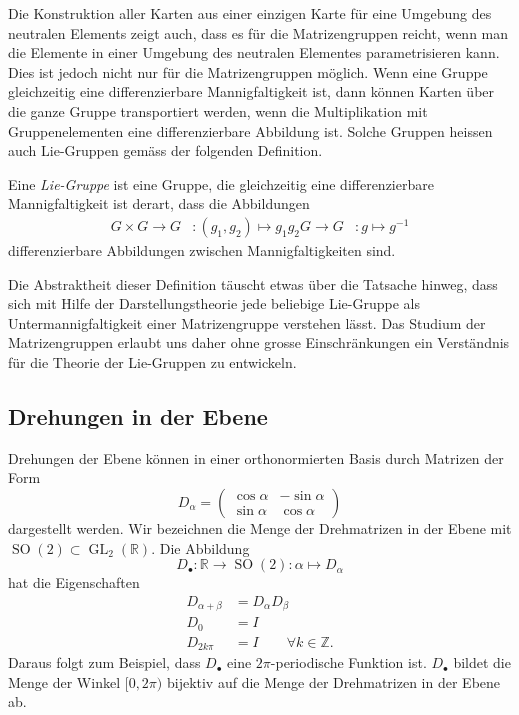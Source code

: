 Die Konstruktion aller Karten aus einer einzigen Karte für eine
Umgebung des neutralen Elements zeigt auch, dass es für die Matrizengruppen
reicht, wenn man die Elemente in einer Umgebung des neutralen
Elementes parametrisieren kann.
Dies ist jedoch nicht nur für die Matrizengruppen möglich.
Wenn eine Gruppe gleichzeitig eine differenzierbare Mannigfaltigkeit
ist, dann können Karten über die ganze Gruppe transportiert werden,
wenn die Multiplikation mit Gruppenelementen eine differenzierbare
Abbildung ist.
Solche Gruppen heissen auch Lie-Gruppen gemäss der folgenden Definition.

\begin{definition}
%
Eine {\em Lie-Gruppe} ist eine Gruppe, die gleichzeitig eine differenzierbare
Mannigfaltigkeit ist derart, dass die Abbildungen
\begin{align*}
G\times G \to G &: (g_1,g_2)\mapsto g_1g_2
G\to G &: g \mapsto g^{-1}
\end{align*}
differenzierbare Abbildungen zwischen Mannigfaltigkeiten sind.
\end{definition}

Die Abstraktheit dieser Definition täuscht etwas über die 
Tatsache hinweg, dass sich mit Hilfe der Darstellungstheorie
jede beliebige Lie-Gruppe als Untermannigfaltigkeit einer 
Matrizengruppe verstehen lässt.
Das Studium der Matrizengruppen erlaubt uns daher ohne grosse
Einschränkungen ein Verständnis für die Theorie der Lie-Gruppen
zu entwickeln.

\subsection{Drehungen in der Ebene
\label{buch:gruppen:drehungen2d}}
Drehungen der Ebene können in einer orthonormierten Basis durch
Matrizen der Form
\[
D_{\alpha}
=
\begin{pmatrix}
\cos\alpha&-\sin\alpha\\
\sin\alpha& \cos\alpha
\end{pmatrix}
\]
dargestellt werden.
Wir bezeichnen die Menge der Drehmatrizen in der Ebene mit
$\operatorname{SO}(2)\subset\operatorname{GL}_2(\mathbb{R})$.
Die Abbildung
\[
D_{\bullet}
\colon
\mathbb{R}\to \operatorname{SO}(2)
:
\alpha \mapsto D_{\alpha}
\]
hat die Eigenschaften
\begin{align*}
D_{\alpha+\beta}&= D_{\alpha}D_{\beta}
\\
D_0&=I
\\
D_{2k\pi}&=I\qquad \forall k\in\mathbb{Z}.
\end{align*}
Daraus folgt zum Beispiel, dass $D_{\bullet}$ eine $2\pi$-periodische
Funktion ist.
$D_{\bullet}$ bildet die Menge der Winkel $[0,2\pi)$ bijektiv auf
die Menge der Drehmatrizen in der Ebene ab.

